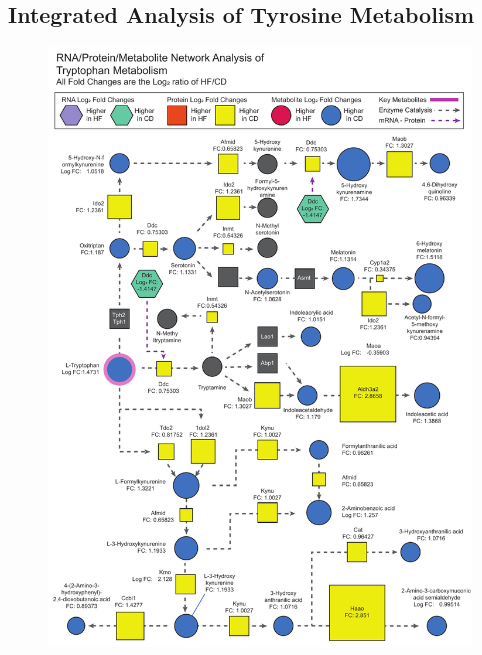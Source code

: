 \documentclass[a4paper]{book}
\begin{document}
	
	\subsection{Integrated Analysis of Tyrosine Metabolism}
	\begin{figure}
		\centering
		\includegraphics[width=\linewidth]{3.Trancriptomics/Integrated_Tyrosine_protein}
		\caption[Integrated analysis tryrosine metabolblic]{}
		\label{fig:integratedtyrosineprotein}
	\end{figure}
	
\end{document}
